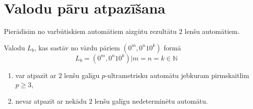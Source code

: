 \documentclass{ludis}
\begin{document}
\section{Valodu pāru atpazīšana}
Pierādīsim no varbūtiskiem automātiem aizgūtu rezultātu $2$ lenšu automātiem.
\begin{teorema}
Valodu $L_b$, kas sastāv no vārdu pāriem $(0^m,0^n10^k)$ formā
\[
	L_b={(0^m,0^n10^k)|m=n=k \in \mathbb{N}}
\]
\begin{enumerate}[label={(\arabic*)}]
	\item var atpazīt ar $2$ lenšu galīgu $p$-ultrametrisku automātu jebkuram pirmskaitlim $p \geq 3$,
	\item nevar atpazīt ar nekādu $2$ lenšu galīgu nedeterminētu automātu.
\end{enumerate}
\end{teorema}
\end{document}

